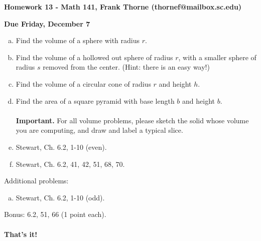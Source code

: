 \documentclass[12pt]{article}
\begin{document}
\setlength{\topmargin}{-2mm}





\begin{center}{\bf Homework 13 - Math 141, Frank Thorne (thornef@mailbox.sc.edu)}
\end{center}
\begin{center}
{\bf Due Friday, December 7}
\end{center}

\begin{enumerate}[(a)]
\item
Find the volume of a sphere with radius $r$.

\item
Find the volume of a hollowed out sphere of radius $r$, with a smaller sphere
of radius $s$ removed from the center. (Hint: there is an easy way!)

\item
Find the volume of a circular cone of radius $r$ and height $h$.

\item
Find the area of a square pyramid with base length $b$ and height $b$.
\\
\\
{\bf Important.} For all volume problems, please sketch the solid whose volume
you are computing, and draw and label a typical slice.
\item
Stewart, Ch. 6.2, 1-10 (even).

\item
Stewart, Ch. 6.2, 41, 42, 51, 68, 70.


\end{enumerate}
Additional problems:
\begin{enumerate}[(a)]
\item
Stewart, Ch. 6.2, 1-10 (odd).

\end{enumerate}
Bonus: 6.2, 51, 66 (1 point each).
\\
\\
{\bf That's it!}
\end{document}
